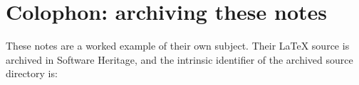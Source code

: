 %
%
\clearpage
\chapter*{Colophon: archiving these notes}
\label{ch:colophon}

These notes are a worked example of their own subject. Their \LaTeX{} source is archived in
Software Heritage, and the intrinsic identifier of the archived source directory is:

\begin{center}
\end{center}

